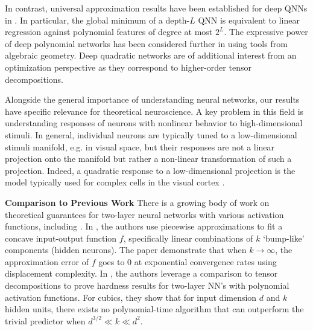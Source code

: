\documentclass[11pt]{article}
\theoremstyle{plain}
\theoremstyle{plain}
\numberwithin{equation}{section}
\numberwithin{lemma}{section}
\numberwithin{theorem}{section}
\numberwithin{corollary}{section}
\numberwithin{observation}{section}
\numberwithin{definition}{section}
\numberwithin{example}{section}
\begin{document}
In contrast, universal approximation results have been established for deep QNNs in \cite{fan18}. In particular, the global minimum of a depth-$L$ QNN is equivalent to linear regression against polynomial features of degree at most $2^L$.  The expressive power of deep polynomial networks has been considered further in \cite{kileel2019expressive} using tools from algebraic geometry.  Deep quadratic networks are of additional interest from an optimization perspective as they correspond to higher-order tensor decompositions.


Alongside the general importance of understanding neural networks, our results have specific relevance for theoretical neuroscience.  A key problem in this field is understanding responses of neurons with nonlinear behavior to high-dimensional stimuli. In general, individual neurons are typically tuned to a low-dimensional stimuli manifold, e.g. in visual space, but their responses are not a linear projection onto the manifold but rather a non-linear transformation of such a projection. Indeed, a quadratic response to a low-dimensional projection is the model typically used  for complex cells in the visual cortex \cite{rust2005spatiotemporal}. 

\textbf{Comparison to Previous Work} There is a growing body of work on theoretical guarantees for two-layer neural networks with various activation functions, including \cite{tian2017analytical, brutzkus2017globally, li2017convergence, janzamin2015beating, zhong2017recovery, panigrahy2017convergence, javanmard2019analysis, mondelli2018connection}. In \cite{javanmard2019analysis}, the authors use piecewise approximations to fit a concave input-output function $f$, specifically linear combinations of $k$ `bump-like' components (hidden neurons).  The paper demonstrate that when $k \rightarrow \infty$, the approximation error of $f$ goes to 0 at exponential convergence rates using displacement complexity.  In \cite{mondelli2018connection}, the authors leverage a comparison to tensor decompositions to prove hardness results for two-layer NN's with polynomial activation functions.  For cubics, they show that for input dimension $d$ and $k$ hidden units, there exists no polynomial-time algorithm that can outperform the trivial predictor when $d^{3/2} \ll k \ll d^2$.
\end{document}
